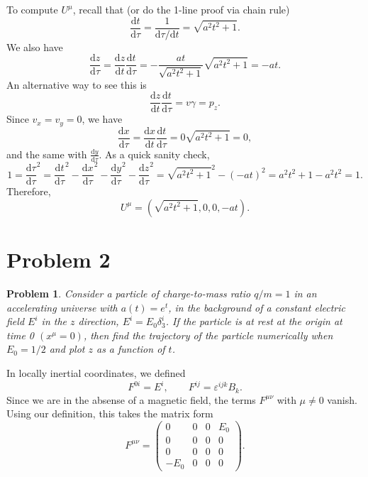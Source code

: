 \documentclass[11pt, letterpaper]{article}
\theoremstyle{plain}
\newtheorem{problem}{Problem}[section]
\begin{document}
To compute $U^\mu $, recall that (or do the 1-line proof via chain rule)
\[
	\frac{\mathrm{d}t}{\mathrm{d}\tau } =\frac{1}{\mathrm{d} \tau /\mathrm{d} t} =\sqrt{a^2t^2+1} 
.\]
We also have
\[
	\frac{\mathrm{d}z}{\mathrm{d}\tau } =\frac{\mathrm{d}z}{\mathrm{d}t} \frac{\mathrm{d}t}{\mathrm{d}\tau } =-\frac{at}{\sqrt{a^2t^2+1} } \sqrt{a^2t^2+1} =-at
.\]
An alternative way to see this is
\[
	\frac{\mathrm{d}z}{\mathrm{d}t} \frac{\mathrm{d}t}{\mathrm{d}\tau } =v\gamma =p_z
.\]
Since $v_x=v_y=0$, we have
\[
	\frac{\mathrm{d}x}{\mathrm{d}\tau } =\frac{\mathrm{d}x}{\mathrm{d}t} \frac{\mathrm{d}t}{\mathrm{d}\tau } =0\sqrt{a^2t^2+1} =0,
\]
and the same with $\frac{\mathrm{d}y}{\mathrm{d}\tau } $. As a quick sanity check,
\[
	1=\frac{\mathrm{d}\tau }{\mathrm{d}\tau } ^2=\frac{\mathrm{d}t}{\mathrm{d}\tau } ^2-\frac{\mathrm{d}x}{\mathrm{d}\tau } ^2-\frac{\mathrm{d}y}{\mathrm{d}\tau } ^2-\frac{\mathrm{d}z}{\mathrm{d}\tau } ^2=\sqrt{a^2t^2+1} ^2-(-at)^2=a^2t^2+1-a^2t^2=1
.\]
Therefore,
\[
	U^\mu =\left( \sqrt{a^2t^2+1} ,0,0,-at \right) 
.\]


\section{Problem 2}

\begin{problem}
	Consider a particle of charge-to-mass ratio $q/m=1$ in an accelerating universe with $a(t)=e^t$, in the background of a constant electric field $E^i$ in the $z$ direction, $E^i=E_0\delta _3^i$. If the particle is at rest at the origin at time 0 $(x^\mu =0)$, then find the trajectory of the particle numerically when $E_0=1/2$ and plot $z$ as a function of $t$.
\end{problem}
In locally inertial coordinates, we defined
\[
	F^{0i} =E^i,\qquad F^{ij} =\varepsilon ^{ijk} B_k
.\]
Since we are in the absense of a magnetic field, the terms $F^{\mu \nu } $ with $\mu \neq 0$ vanish. Using our definition, this takes the matrix form
\[
	F^{\mu \nu } =\begin{pmatrix}
	0 & 0 & 0 & E_0 \\
	0 & 0 & 0 & 0 \\
	0 & 0 & 0 & 0 \\
	-E_0 & 0 & 0 & 0
	\end{pmatrix}
.\]
\end{document}
